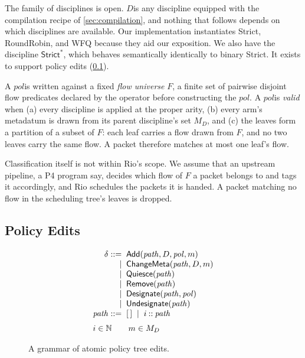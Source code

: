 \documentclass[sigplan,anonymous,review,nonacm]{acmart}
\newcommand{\notation}[1]{\ensuremath{#1}\ifmmode\else\xspace\fi}
\newcommand{\pol}{\notation{\mathit{pol}}}
\newcommand{\disc}{\notation{D}}
\newcommand{\Strict}{\textsf{Strict}}
\newcommand{\Strictstar}{\textsf{Strict}^{*}}
\newcommand{\WFQ}{\textsf{WFQ}}
\newcommand{\RR}{\textsf{RoundRobin}}
\newcommand{\Add}{\textsf{Add}}
\newcommand{\ChangeMeta}{\textsf{ChangeMeta}}
\newcommand{\Quiesce}{\textsf{Quiesce}}
\newcommand{\Remove}{\textsf{Remove}}
\newcommand{\Designate}{\textsf{Designate}}
\newcommand{\Undesignate}{\textsf{Undesignate}}
\begin{document}
The family of disciplines is open.
\disc is any discipline equipped with the compilation recipe of \cref{sec:compilation}, and nothing that follows depends on which disciplines are available.
Our implementation instantiates \Strict, \RR, and \WFQ{} because they aid our exposition.
We also have the discipline \(\Strictstar\), which behaves semantically identically to binary \Strict{}.
It exists to support policy edits (\cref{sec:delta-grammar}).

A \pol is written against a fixed \emph{flow universe} \(F\), a finite set of pairwise disjoint flow predicates declared by the operator before constructing the \pol.
A \pol is \emph{valid} when (a) every discipline is applied at the proper arity, (b) every arm's metadatum is drawn from its parent discipline's set \(M_{D}\), and (c) the leaves form a partition of a subset of \(F\): each leaf carries a flow drawn from \(F\), and no two leaves carry the same flow.
A packet therefore matches at most one leaf's flow.

Classification itself is not within Rio's scope.
We assume that an upstream pipeline, a P4 program say, decides which flow of \(F\) a packet belongs to and tags it accordingly, and Rio schedules the packets it is handed.
A packet matching no flow in the scheduling tree's leaves is dropped.

\subsection{Policy Edits}\label{sec:delta-grammar}

\begin{figure}[t]
\small
\[
\begin{array}{@{}r@{\;\;}l@{}}
\delta \mathrel{::=} & \Add(\mathit{path}, D, \mathit{pol}, m)\\
\mid & \ChangeMeta(\mathit{path}, D, m)\\
\mid & \Quiesce(\mathit{path})\\
\mid & \Remove(\mathit{path})\\
\mid & \Designate(\mathit{path}, \mathit{pol})\\
\mid & \Undesignate(\mathit{path})\\
\mathit{path} \mathrel{::=} & [\,] \;\mid\; i \mathbin{::} \mathit{path}\\[6pt]
\multicolumn{2}{@{}l@{}}{i \in \mathbb{N} \qquad m \in M_{D}}
\end{array}
\]
\caption{A grammar of atomic policy tree edits.}
\label{fig:delta-grammar}
\end{figure}
\end{document}
